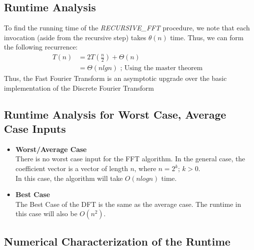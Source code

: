 \documentclass{article}
\begin{document}
\subsection{Runtime Analysis}
To find the running time of the \textit{RECURSIVE\_FFT} procedure, we note that each invocation (aside from the recursive step) takes $\theta(n)$ time. Thus, we can form the following recurrence: \\
\begin{align*}
T(n)&=2T(\frac{n}{2})+\Theta(n) \\
&=\Theta(nlgn) \text{ ; Using the master theorem}
\end{align*}
Thus, the Fast Fourier Transform is an asymptotic upgrade over the basic implementation of the Discrete Fourier Transform

\subsection{Runtime Analysis for Worst Case, Average Case Inputs}
\begin{itemize}
\item 
\textbf{Worst/Average Case} \\
There is no worst case input for the FFT algorithm. In the general case, the coefficient vector is a vector of length $n$, where $n=2^{k}$; $k>0$. \\
In this case, the algorithm will take $O(nlogn)$ time.
\item
\textbf{Best Case} \\
The Best Case of the DFT is the same as the average case. The runtime in this case will also be $O(n^{2})$.
\end{itemize}

\subsection{Numerical Characterization of the Runtime}
\end{document}
